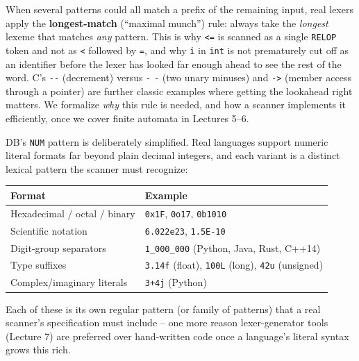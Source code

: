 \documentclass[11pt]{article}
\begin{document}
\begin{enrichment}
When several patterns could all match a prefix of the remaining input, real lexers apply the
\textbf{longest-match} (``maximal munch'') rule: always take the \emph{longest} lexeme that
matches \emph{any} pattern. This is why \texttt{<=} is scanned as a single \texttt{RELOP} token
and not as \texttt{<} followed by \texttt{=}, and why \texttt{i} in \texttt{int} is not
prematurely cut off as an identifier before the lexer has looked far enough ahead to see the
rest of the word. C's \texttt{-{}-{}} (decrement) versus \texttt{-} \texttt{-} (two unary
minuses) and \texttt{-{}>} (member access through a pointer) are further classic examples where
getting the lookahead right matters. We formalize \emph{why} this rule is needed, and how a
scanner implements it efficiently, once we cover finite automata in Lectures 5--6.
\end{enrichment}

\begin{enrichment}
DB's \texttt{NUM} pattern is deliberately simplified. Real languages support numeric literal
formats far beyond plain decimal integers, and each variant is a distinct lexical pattern the
scanner must recognize:
\begin{center}
\small
\begin{tabularx}{\textwidth}{@{}l X@{}}
\toprule
\textbf{Format} & \textbf{Example} \\
\midrule
Hexadecimal / octal / binary & \texttt{0x1F}, \texttt{0o17}, \texttt{0b1010} \\
Scientific notation & \texttt{6.022e23}, \texttt{1.5E-10} \\
Digit-group separators & \texttt{1\_000\_000} (Python, Java, Rust, C++14) \\
Type suffixes & \texttt{3.14f} (float), \texttt{100L} (long), \texttt{42u} (unsigned) \\
Complex/imaginary literals & \texttt{3+4j} (Python) \\
\bottomrule
\end{tabularx}
\end{center}
Each of these is its own regular pattern (or family of patterns) that a real scanner's
specification must include -- one more reason lexer-generator tools (Lecture 7) are preferred
over hand-written code once a language's literal syntax grows this rich.
\end{enrichment}
\end{document}
